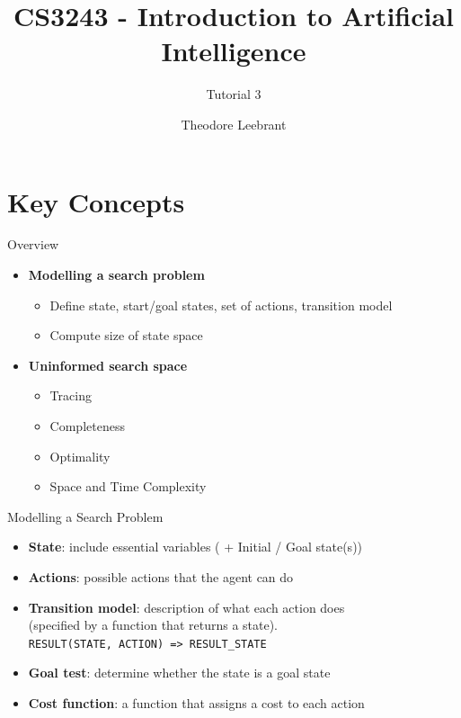 \documentclass[10pt]{beamer}
\title{CS3243 - Introduction to Artificial Intelligence}
\subtitle{Tutorial 3}
\date{}
\author{Theodore Leebrant}
\institute{Tutorial Group 3}
\begin{document}
\maketitle

\section[Key Concepts]{Key Concepts}

\begin{frame}[fragile]{Overview}
\begin{itemize}
  \item \textbf{Modelling a search problem}
  \begin{itemize}
    \item Define state, start/goal states, set of actions, transition model
    \item Compute size of state space
  \end{itemize}
  \item \textbf{Uninformed search space}
  \begin{itemize}
    \item Tracing
    \item Completeness
    \item Optimality
    \item Space and Time Complexity
  \end{itemize}
\end{itemize}
\end{frame}

\begin{frame}[fragile]{Modelling a Search Problem}
\begin{itemize}
  \item \textbf{State}: include essential variables ( + Initial / Goal state(s))
  \item \textbf{Actions}: possible actions that the agent can do
  \item \textbf{Transition model}: description of what each action does \\
  (specified by a function that returns a state). \\
  \verb|RESULT(STATE, ACTION) => RESULT_STATE|
  \item \textbf{Goal test}: determine whether the state is a goal state
  \item \textbf{Cost function}: a function that assigns a cost to each action
\end{itemize}
\end{frame}
\end{document}
